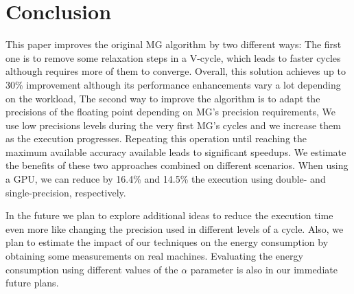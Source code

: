 \section{Conclusion}
\label{sec:conclusions}

This paper improves the original MG algorithm by two different ways: 
The first one is to remove some relaxation steps in a V-cycle, which leads to faster cycles although requires more of them to converge.
Overall, this solution achieves up to 30\% improvement although its performance enhancements vary a lot depending on the workload,
The second way to improve the algorithm is to adapt the precisions of the floating point depending on MG's precision requirements,
We use low precisions levels during the very first MG's cycles and we increase them as the execution progresses. 
Repeating this operation until reaching the maximum available accuracy available leads to significant speedups.
We estimate the benefits of these two approaches combined on different scenarios. 
When using a GPU, we can reduce by 16.4\% and 14.5\% the execution using double- and single-precision, respectively. 

In the future we plan to explore additional ideas to reduce the execution time even more like changing the precision used in different levels of a cycle. 
Also, we plan to estimate the impact of our techniques on the energy consumption by obtaining some measurements on real machines.
Evaluating the energy consumption using different values of the $\alpha$ parameter is also in our immediate future plans.
